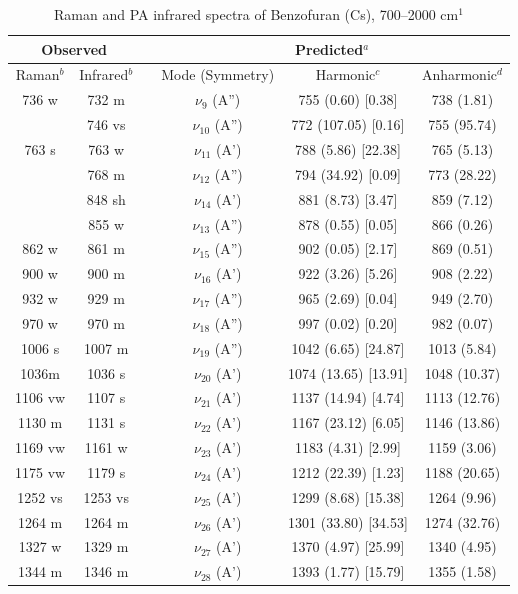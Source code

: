 \begin{table}[H]
	\caption{Raman and PA infrared spectra of Benzofuran (Cs), 700–2000 cm$^{1}$}
	\begin{center}
		\begin{tabular}{c c c c c c}
			\hline
			\multicolumn{ 2}{c}{Observed} & \multicolumn{1}{c}{} & \multicolumn{ 3}{c}{Predicted$^{a}$} \\ \hline
			Raman$^{b}$ & \multicolumn{1}{c}{Infrared$^{b}$} &  & \multicolumn{1}{c}{Mode (Symmetry)} & \multicolumn{1}{c}{Harmonic$^{c}$} & Anharmonic$^{d}$ \\ \hline
736 w & 732 m &  & $\nu_{9}$ (A”) & 755 (0.60) [0.38] & 738 (1.81) \\ 
& 746 vs &  & $\nu_{10}$ (A”) & 772 (107.05) [0.16] & 755 (95.74) \\ 
763 s & 763 w &  & $\nu_{11}$ (A’) & 788 (5.86) [22.38] & 765 (5.13) \\ 
& 768 m &  & $\nu_{12}$ (A”) & 794 (34.92) [0.09] & 773 (28.22) \\ 
& 848 sh &  & $\nu_{14}$ (A’) & 881 (8.73) [3.47] & 859 (7.12) \\ 
& 855 w &  & $\nu_{13}$ (A”) &     878 (0.55) [0.05] & 866 (0.26) \\ 
862 w & 861 m &  & $\nu_{15}$ (A”) & 902 (0.05) [2.17] & 869 (0.51) \\ 
900 w & 900 m &  &     $\nu_{16}$ (A’) & 922 (3.26) [5.26] & 908 (2.22) \\ 
932 w & 929 m &  & $\nu_{17}$ (A”) & 965 (2.69) [0.04] & 949 (2.70) \\ 
970 w & 970 m &  & $\nu_{18}$ (A”) & 997 (0.02) [0.20] & 982 (0.07) \\ 
1006 s & 1007 m &  & $\nu_{19}$ (A”) & 1042 (6.65) [24.87] & 1013 (5.84) \\ 
1036m & 1036 s &  & $\nu_{20}$ (A’)
&  1074 (13.65) [13.91] & 1048 (10.37) \\ 
1106 vw & 1107 s & \multicolumn{1}{c}{} & \multicolumn{1}{c}{$\nu_{21}$ (A’)} & 1137 (14.94) [4.74] & 1113 (12.76) \\ 
1130 m & 1131 s & \multicolumn{1}{c}{} & \multicolumn{1}{c}{$\nu_{22}$ (A’)} & 1167 (23.12) [6.05] & 1146 (13.86) \\ 
1169 vw & 1161 w & \multicolumn{1}{c}{} & \multicolumn{1}{c}{$\nu_{23}$ (A’)} & 1183 (4.31) [2.99] & 1159 (3.06) \\ 
1175 vw & 1179 s & \multicolumn{1}{c}{} & \multicolumn{1}{c}{$\nu_{24}$ (A’)
} & \multicolumn{1}{c}{   1212 (22.39) [1.23]} & 1188 (20.65) \\ 
1252 vs & 1253 vs & \multicolumn{1}{c}{} & \multicolumn{1}{c}{$\nu_{25}$ (A’)
} & 1299 (8.68) [15.38] & 1264 (9.96) \\ 
1264 m & 1264 m &  & $\nu_{26}$ (A’)& 1301 (33.80) [34.53] & 1274 (32.76) \\ 
1327 w & 1329 m &  & $\nu_{27}$ (A’) & 1370 (4.97) [25.99] & 1340 (4.95) \\ 
1344 m & 1346 m &  & $\nu_{28}$ (A’) & 1393 (1.77) [15.79] & 1355 (1.58)\\ 
\bottomrule
\end{tabular}
\end{center}
\end{table}


